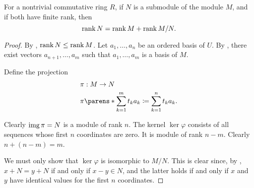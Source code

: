 \begin{proposition}\label{thm:submodule_rank}
  For a nontrivial commutative ring \( R \), if \( N \) is a submodule of the module \( M \), and if both have finite rank, then
  \begin{equation*}
    \operatorname{rank} N = \operatorname{rank} M + \operatorname{rank} M / N.
  \end{equation*}
\end{proposition}
\begin{proof}
  By , \( \operatorname{rank} N \leq \operatorname{rank} M \). Let \( a_1, \ldots, a_n \) be an ordered basis of \( U \). By , there exist vectors \( a_{n+1}, \ldots, a_m \) such that \( a_1, \ldots, a_m \) is a basis of \( M \).

  Define the projection
  \begin{equation*}
    \begin{aligned}
      &\pi: M \to N \\
      &\pi\parens*{ \sum_{k=1}^m t_k a_k } \coloneqq \sum_{k=1}^n t_k a_k.
    \end{aligned}
  \end{equation*}

  Clearly \( \operatorname{img} \pi = N \) is a module of rank \( n \). The kernel \( \ker \varphi \) consists of all sequences whose first \( n \) coordinates are zero. It is module of rank \( n - m \). Clearly \( n + (n - m) = m \).

  We must only show that \( \ker \varphi \) is isomorphic to \( M / N \). This is clear since, by , \( x + N = y + N \) if and only if \( x - y \in N \), and the latter holds if and only if \( x \) and \( y \) have identical values for the first \( n \) coordinates.
\end{proof}


